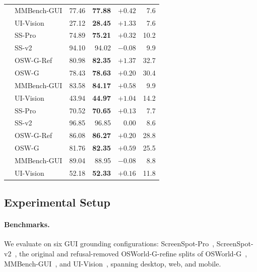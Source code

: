 \begin{table}[!t]
\begin{tabular}{ll rrr r}
 & MMBench-GUI   & 77.46 & \textbf{77.88} & $+0.42$ & 7.6 \\
 & UI-Vision     & 27.12 & \textbf{28.45} & $+1.33$ & 7.6 \\
\midrule
{}
 & SS-Pro        & 74.89 & \textbf{75.21} & $+0.32$ & 10.2 \\
 & SS-v2         & 94.10 & 94.02 & $-0.08$ & 9.9 \\
 & OSW-G-Ref     & 80.98 & \textbf{82.35} & $+1.37$ & 32.7 \\
 & OSW-G         & 78.43 & \textbf{78.63} & $+0.20$ & 30.4 \\
 & MMBench-GUI   & 83.58 & \textbf{84.17} & $+0.58$ & 9.9 \\
 & UI-Vision     & 43.94 & \textbf{44.97} & $+1.04$ & 14.2 \\
\midrule
{}
 & SS-Pro        & 70.52 & \textbf{70.65} & $+0.13$ & 7.7 \\
 & SS-v2         & 96.85 & 96.85 & $0.00$ & 8.6 \\
 & OSW-G-Ref     & 86.08 & \textbf{86.27} & $+0.20$ & 28.8 \\
 & OSW-G         & 81.76 & \textbf{82.35} & $+0.59$ & 25.5 \\
 & MMBench-GUI   & 89.04 & 88.95 & $-0.08$ & 8.8 \\
 & UI-Vision     & 52.18 & \textbf{52.33} & $+0.16$ & 11.8 \\
\bottomrule
\end{tabular}
\end{table}

\subsection{Experimental Setup}
\label{sec:experiments:setup}

\paragraph{Benchmarks.}
We evaluate on six GUI grounding configurations: ScreenSpot-Pro~\citep{screenspotpro}, ScreenSpot-v2~\citep{Os-atlas}, the original and refusal-removed OSWorld-G-refine splits of OSWorld-G~\citep{xie2025scaling}, MMBench-GUI~\citep{mmbench}, and UI-Vision~\citep{ui-vision}, spanning desktop, web, and mobile.

